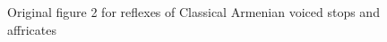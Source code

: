 \begin{figure}
	\centering
	\caption{Original figure 2 for reflexes of Classical Armenian voiced stops and affricates}
	\label{fig:fig2 original}
\end{figure}


